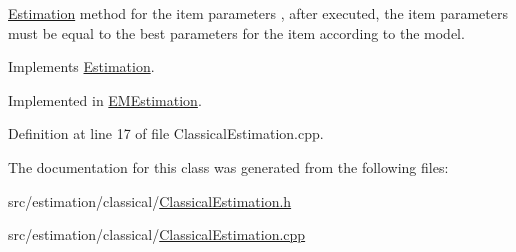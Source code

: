 \hyperlink{classEstimation}{Estimation} method for the item parameters , after executed, the item parameters must be equal to the best parameters for the item according to the model. 



Implements \hyperlink{classEstimation_a65f0bd4b60e82a2ab374abd687c69caa}{Estimation}.



Implemented in \hyperlink{classEMEstimation_a6cd3ac7193ff9d5d92bd90b58da26e11}{E\+M\+Estimation}.



Definition at line 17 of file Classical\+Estimation.\+cpp.



The documentation for this class was generated from the following files\+:\begin{DoxyCompactItemize}
\item 
src/estimation/classical/\hyperlink{ClassicalEstimation_8h}{Classical\+Estimation.\+h}\item 
src/estimation/classical/\hyperlink{ClassicalEstimation_8cpp}{Classical\+Estimation.\+cpp}\end{DoxyCompactItemize}
